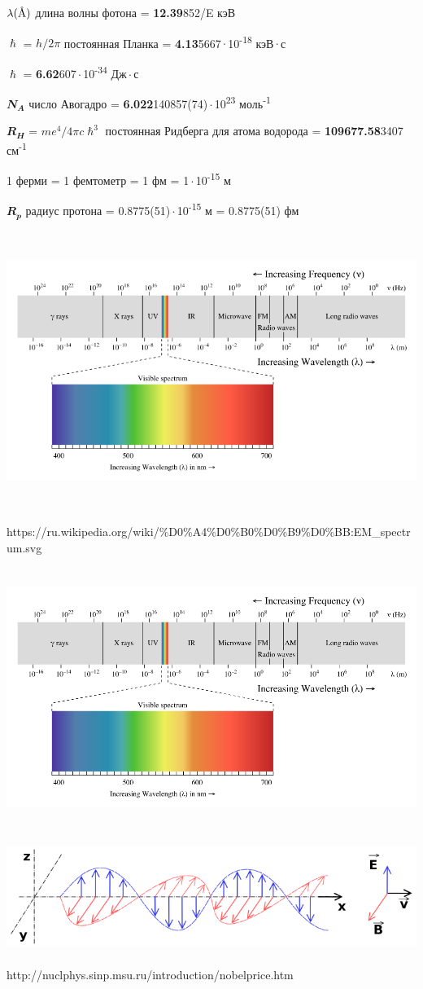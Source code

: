\documentclass[a4paper,14pt, openany, twoside, draft]{extbook} %
\newcommand{\AAA}{\textup{\AA}}
\begin{document}
$\lambda(\AAA)$  длина волны фотона = \textbf{12.39}852/E кэВ

$\mathbfit{\hslash}$ = $h/2\pi$ постоянная Планка = \textbf{4.13}5667\,$\cdot$\,10\textsuperscript{-18} кэВ\,$\cdot$\,с

$\mathbfit{\hslash}$ = \textbf{6.62}607\,$\cdot$\,10\textsuperscript{-34} Дж\,$\cdot$\,с

$\mathbfit{N_A}$  число Авогадро = \textbf{6.022}140857(74)\,$\cdot$\,10\textsuperscript{23} моль\textsuperscript{-1}

$\mathbfit{R_H}$ = $me^4/4\pi c\hslash^3$ постоянная Ридберга для атома водорода = \textbf{109677.58}3407 см\textsuperscript{-1}

1 ферми = 1 фемтометр = 1 фм = 1\,$\cdot$\,10\textsuperscript{-15} м

$\mathbfit{R_p}$ радиус протона = 0.8775(51)\,$\cdot$\,10\textsuperscript{-15} м = 0.8775(51) фм

\clearpage{}
 \includegraphics[width=16.866cm,height=9.022cm]{EMRad-img001.png}

https://ru.wikipedia.org/wiki/\%D0\%A4\%D0\%B0\%D0\%B9\%D0\%BB:EM\_spectrum.svg

 \includegraphics[width=15.665cm,height=8.382cm]{EMRad-img002.png}

 \includegraphics[width=14.713cm,height=3.627cm]{EMRad-img003.png}

http://nuclphys.sinp.msu.ru/introduction/nobelprice.htm
\end{document}
